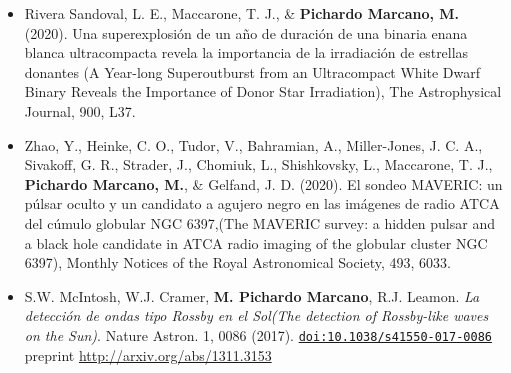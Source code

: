\documentclass[letterpaper,10pt]{article}
\begin{document}
\begin{itemize}[label=$\blacktriangleright$]
        

        
    \item Rivera Sandoval, L. E., Maccarone, T. J., \& \textbf{Pichardo Marcano, M.} (2020). Una superexplosi\'on de un a\~{n}o de duraci\'on de una binaria enana blanca ultracompacta revela la importancia de la irradiaci\'on de estrellas donantes (A Year-long Superoutburst from an Ultracompact White Dwarf Binary Reveals the Importance of Donor Star Irradiation), The Astrophysical Journal, 900, L37. \\

    \item Zhao, Y., Heinke, C. O., Tudor, V., Bahramian, A., Miller-Jones, J. C. A., Sivakoff, G. R., Strader, J., Chomiuk, L., Shishkovsky, L., Maccarone, T. J., \textbf{Pichardo Marcano, M.}, \& Gelfand, J. D. (2020). El sondeo MAVERIC: un p\'ulsar oculto y un candidato a agujero negro en las im\'agenes de radio ATCA del c\'umulo globular NGC 6397,(The MAVERIC survey: a hidden pulsar and a black hole candidate in ATCA radio imaging of the globular cluster NGC 6397), Monthly Notices of the Royal Astronomical Society, 493, 6033. \href{10.1093/mnras/staa631} \\


\item  S.W. McIntosh, W.J. Cramer, \textbf{M. Pichardo Marcano}, R.J. Leamon. \emph{La detecci\'on de ondas tipo Rossby en el Sol(The detection of Rossby-like waves on the Sun)}. Nature Astron. 1, 0086 (2017). \href{http://dx.doi.org/10.1038/s41550-017-0086}{\tt doi:10.1038/s41550-017-0086} \\






 preprint \url{http://arxiv.org/abs/1311.3153} \\


\end{itemize}
\end{document}
